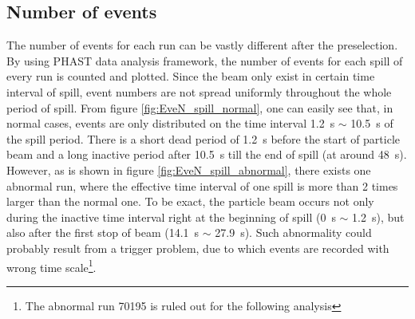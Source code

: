 \subsection{Number of events}
The number of events for each run can be vastly different after the preselection. By using PHAST data analysis framework, the number of events for each spill of every run is counted and plotted. Since the beam only exist in certain time interval of spill, event numbers are not spread uniformly throughout the whole period of spill. From figure \ref{fig:EveN_spill_normal}, one can easily see that, in normal cases, events are only distributed on the time interval \SI{1.2}{\second} $\sim$ \SI{10.5}{\second} of the spill period. There is a short dead period of \SI{1.2}{\second} before the start of particle beam and a long inactive period after \SI{10.5}{\second} till the end of spill (at around \SI{48}{\second}). However, as is shown in figure \ref{fig:EveN_spill_abnormal}, there exists one abnormal run, where the effective time interval of one spill is more than 2 times larger than the normal one. To be exact, the particle beam occurs not only during the inactive time interval right at the beginning of spill (\SI{0}{\second} $\sim$ \SI{1.2}{\second}), but also after the first stop of beam (\SI{14.1}{\second} $\sim$ \SI{27.9}{\second}). Such abnormality could probably result from a trigger problem, due to which events are recorded with wrong time scale\footnote[2]{The abnormal run 70195 is ruled out for the following analysis}.

